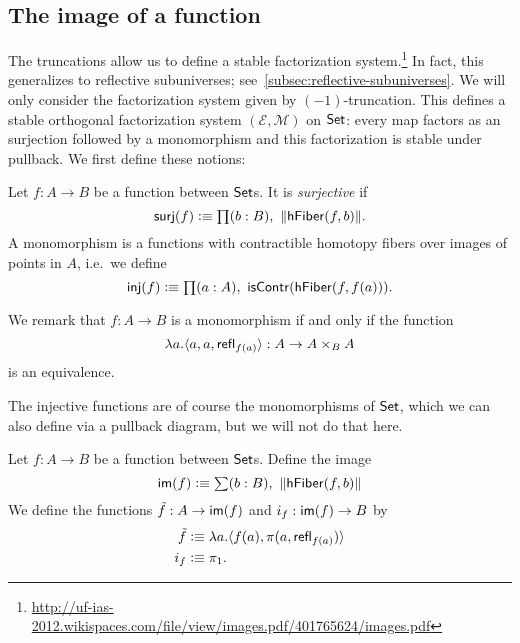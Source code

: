 \subsection{The image of a function}

The truncations allow us to define a stable factorization
system.\footnote{\url{http://uf-ias-2012.wikispaces.com/file/view/images.pdf/401765624/images.pdf}}
In fact, this generalizes to reflective subuniverses; see~\autoref{subsec:reflective-subuniverses}.
We will only consider the factorization system given by $(-1)$-truncation.
This defines a stable orthogonal factorization system $(\mathcal{E},
\mathcal{M})$ on $\mathsf{Set}$: every map factors as an surjection followed by a 
monomorphism and this factorization is stable under pullback.
We first define these notions:
\begin{defn}
Let $f:A\to B$ be a function between $\mathsf{Set}$s. It is \emph{surjective} if
\begin{equation*}
\mathsf{surj}(f)\defeq\prd{b:B} \|\hfiber{f}b\|.
\end{equation*}
A monomorphism is a functions with contractible homotopy fibers over images of points in $A$, i.e.\ we define
\begin{equation*}
\mathsf{inj}(f)\defeq\prd{a:A} \mathsf{isContr}(\hfiber{f}{f(a)}).
\end{equation*}
\end{defn}

We remark that $f:A\to B$ is a monomorphism if and only if the function
\begin{equation*}
\lambda a.{\langle a,a,\mathsf{refl}_{f(a)}\rangle}:A\to A\times_B A
\end{equation*}
is an equivalence.

The injective functions are of course the monomorphisms of
$\mathsf{Set}$, which we can also define via a pullback diagram, but we will not do that here.

\begin{defn}
Let $f:A\to B$ be a function between $\mathsf{Set}$s. Define the image 
\begin{equation*}
\im(f)\defeq\sm{b:B} \|\hfiber{f}b\|
\end{equation*}
We define the functions $\tilde{f}:A\to\mathsf{im}(f)$ and $i_f:\mathsf{im}(f)\to B$ by
\begin{align*}
\tilde{f} & \vcentcolon\equiv \lambda a.{\langle f(a),\pi(a,\mathsf{refl}_{f(a)})\rangle}\\
i_f & \vcentcolon\equiv \pi_1.
\end{align*}
\end{defn}

